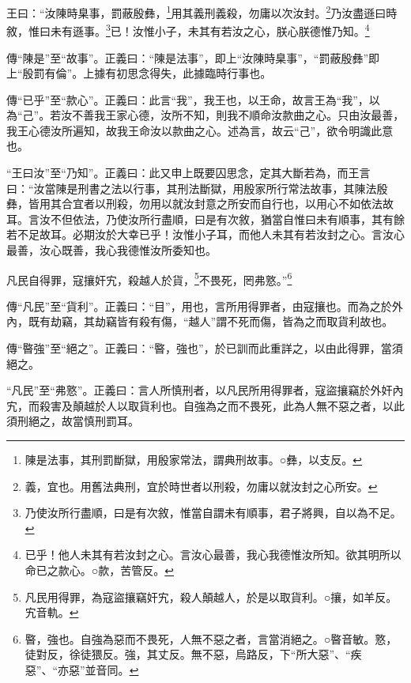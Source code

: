 王曰：“汝陳時臬事，罰蔽殷彝，\footnote{陳是法事，其刑罰斷獄，用殷家常法，謂典刑故事。○彝，以支反。}用其義刑義殺，勿庸以次汝封。\footnote{義，宜也。用舊法典刑，宜於時世者以刑殺，勿庸以就汝封之心所安。}乃汝盡遜曰時敘，惟曰未有遜事。\footnote{乃使汝所行盡順，曰是有次敘，惟當自謂未有順事，君子將興，自以為不足。}已！汝惟小子，未其有若汝之心，朕心朕德惟乃知。\footnote{已乎！他人未其有若汝封之心。言汝心最善，我心我德惟汝所知。欲其明所以命已之款心。○款，苦管反。}


{\noindent\zhuan{}\fzbyks 傳“陳是”至“故事”。正義曰：“陳是法事”，即上“汝陳時臬事”，“罰蔽殷彝”即上“殷罰有倫”。上據有初思念得失，此據臨時行事也。 \par}

{\noindent\zhuan{}\fzbyks 傳“已乎”至“款心”。正義曰：此言“我”，我王也，以王命，故言王為“我”，以為“己”。若汝不善我王家心德，汝所不知，則我不順命汝款曲之心。只由汝最善，我王心德汝所遍知，故我王命汝以款曲之心。述為言，故云“己”，欲令明識此意也。 \par}

{\noindent\shu{}\fzkt “王曰汝”至“乃知”。正義曰：此又申上既要囚思念，定其大斷若為，而王言曰：“汝當陳是刑書之法以行事，其刑法斷獄，用殷家所行常法故事，其陳法殷彝，皆用其合宜者以刑殺，勿用以就汝封意之所安而自行也，以用心不如依法故耳。言汝不但依法，乃使汝所行盡順，曰是有次敘，猶當自惟曰未有順事，其有餘若不足故耳。必期汝於大幸已乎！汝惟小子耳，而他人未其有若汝封之心。言汝心最善，汝心既善，我心我德惟汝所委知也。 \par}

凡民自得罪，寇攘奸宄，殺越人於貨，\footnote{凡民用得罪，為寇盜攘竊奸宄，殺人顛越人，於是以取貨利。○攘，如羊反。宄音軌。}不畏死，罔弗憝。”\footnote{暋，強也。自強為惡而不畏死，人無不惡之者，言當消絕之。○暋音敏。憝，徒對反，徐徒猥反。強，其丈反。無不惡，烏路反，下“所大惡”、“疾惡”、“亦惡”並音同。}


{\noindent\zhuan{}\fzbyks 傳“凡民”至“貨利”。正義曰：“目”，用也，言所用得罪者，由寇攘也。而為之於外內，既有劫竊，其劫竊皆有殺有傷，“越人”謂不死而傷，皆為之而取貨利故也。 \par}

{\noindent\zhuan{}\fzbyks 傳“暋強”至“絕之”。正義曰：“暋，強也”，於已訓而此重詳之，以由此得罪，當須絕之。 \par}

{\noindent\shu{}\fzkt “凡民”至“弗憝”。正義曰：言人所慎刑者，以凡民所用得罪者，寇盜攘竊於外奸內宄，而殺害及顛越於人以取貨利也。自強為之而不畏死，此為人無不惡之者，以此須刑絕之，故當慎刑罰耳。 \par}

